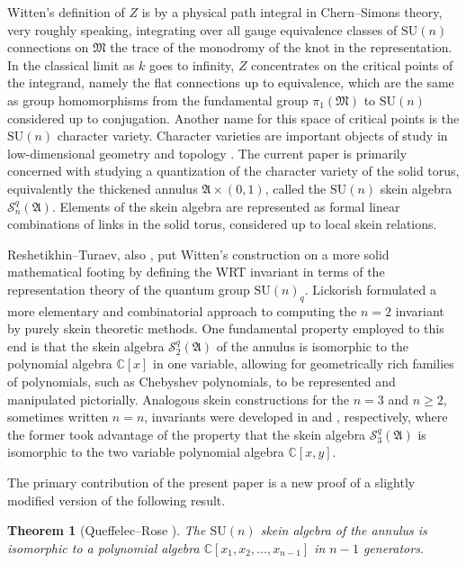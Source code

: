 \documentclass[12pt,
	]{amsart}
\newtheorem*{theorem*}{Theorem}
\theoremstyle{definition}
\newcommand{\mrm}[1]{\mathrm{#1}}
\newcommand{\mbb}[1]{\mathbb{#1}}
\newcommand{\mcal}[1]{\mathcal{#1}}
\newcommand{\mfrak}[1]{\mathfrak{#1}}
\newcommand{\C}{\mbb{C}}
\newcommand{\sk}{\mcal{S}_n^q}
\newcommand{\ann}{\mfrak{A}}
\newcommand{\man}{\mfrak{M}}
\begin{document}
Witten's definition of $Z$ is by a physical path integral in Chern--Simons theory, very roughly speaking, integrating over all gauge equivalence classes of $\mrm{SU}(n)$ connections on $\man$ the trace of the monodromy of the knot in the representation.  In the classical limit as $k$ goes to infinity, $Z$ concentrates on the critical points of the integrand, namely the flat connections up to equivalence, which are the same as group homomorphisms from the fundamental group $\pi_1(\man)$ to $\mrm{SU}(n)$ considered up to conjugation.  Another name for this space of critical points is the $\mrm{SU}(n)$ character variety.  Character varieties are important objects of study in low-dimensional geometry and topology \cite{fockMR2233852, GoldmanInvent86, gunninghamMR4557403, HitchinTopology92, LabourieInvent06}.  The current paper is primarily concerned with studying a quantization of the character variety of the solid torus, equivalently the thickened annulus $\ann\times(0,1)$, called the $\mrm{SU}(n)$ skein algebra $\sk(\ann)$.  Elements of the skein algebra are represented as formal linear combinations of links in the solid torus, considered up to local skein relations.    

Reshetikhin--Turaev, also \cite{turaevMR1217386}, put Witten's construction on a more solid mathematical footing by defining the WRT invariant in terms of the representation theory of the quantum group $\mrm{SU}(n)_q$.  Lickorish \cite{lickorishMR1227009} formulated a more elementary and combinatorial approach to computing the $n=2$ invariant by purely skein theoretic methods.  One fundamental property employed to this end is that the skein algebra $\mcal{S}_2^q(\ann)$ of the annulus is isomorphic to the polynomial algebra $\C[x]$ in one variable, allowing for geometrically rich families of polynomials, such as Chebyshev polynomials, to be represented and manipulated pictorially.  Analogous skein constructions for the $n=3$ and  $n\geq2$, sometimes written $n=n$, invariants were developed in \cite{ohtsukiMR1457194} and \cite{yokotaMR1427678}, respectively, where the former took advantage of the property that the skein algebra $\mcal{S}_3^q(\ann)$ is isomorphic to the two variable polynomial algebra $\C[x,y]$.  

The primary contribution of the present paper is a new proof of a slightly modified version of the following result.

\begin{theorem*}[Queffelec--Rose \cite{queffelecMR3729501}]
The $\mrm{SU}(n)$ skein algebra of the annulus is isomorphic to a polynomial algebra $\C[x_1,x_2,\dots,x_{n-1}]$ in $n-1$ generators.  
\end{theorem*}
\end{document}
